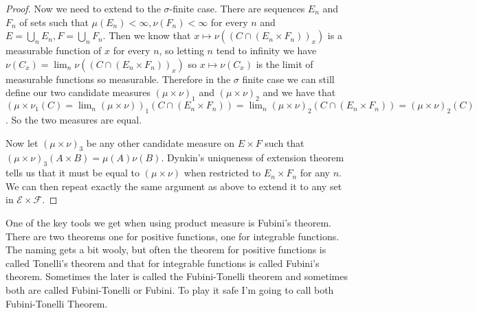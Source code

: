 \documentclass[11pt]{article}
\theoremstyle{definition}
\theoremstyle{remark}
\begin{document}
\begin{proof}
Now we need to extend to the $\sigma$-finite case. There are sequences $E_n$ and $F_n$ of sets such that $\mu(E_n)<\infty, \nu(F_n)< \infty$ for every $n$ and $E= \bigcup_n E_n, F = \bigcup_n F_n$. Then we know that $x \mapsto \nu((C \cap (E_n \times F_n))_x)$ is a measurable function of $x$ for every $n$, so letting $n$ tend to infinity we have $\nu(C_x) = \lim_n \nu((C \cap (E_n \times F_n))_x)$ so $x \mapsto \nu(C_x)$ is the limit of measurable functions so measurable. Therefore in the $\sigma$ finite case we can still define our two candidate measures $(\mu \times \nu)_1$ and $(\mu \times \nu)_2$ and we have that $(\mu \times \nu_1(C) = \lim_n (\mu \times \nu))_1(C \cap (E_n \times F_n)) = \lim_n (\mu \times \nu)_2 ( C \cap (E_n \times F_n)) = (\mu \times \nu)_2 (C)$. So the two measures are equal.

Now let $(\mu \times \nu)_3$ be any other candidate measure on $E \times F$ such that $(\mu \times \nu)_3 (A \times B) = \mu(A) \nu(B)$. Dynkin's uniqueness of extension theorem tells us that it must be equal to $(\mu \times \nu)$ when restricted to $E_n \times F_n$ for any $n$. We can then repeat exactly the same argument as above to extend it to any set in $\mathcal{E} \times \mathcal{F}$.
\end{proof}

One of the key tools we get when using product measure is Fubini's theorem. There are two theorems one for positive functions, one for integrable functions. The naming gets a bit wooly, but often the theorem for positive functions is called Tonelli's theorem and that for integrable functions is called Fubini's theorem. Sometimes the later is called the Fubini-Tonelli theorem and sometimes both are called Fubini-Tonelli or Fubini. To play it safe I'm going to call both Fubini-Tonelli Theorem.
\end{document}
